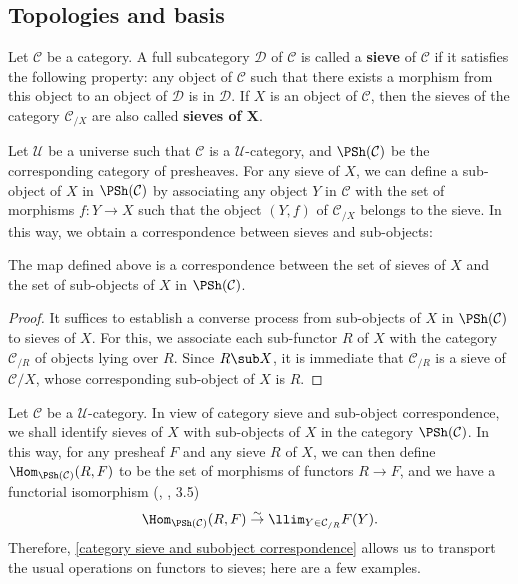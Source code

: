\subsection{Topologies and basis}
Let $\mathcal{C}$ be a category. A full subcategory $\mathcal{D}$ of $\mathcal{C}$ is called a \textbf{sieve} of $\mathcal{C}$ if it satisfies the following property: any object of $\mathcal{C}$ such that there exists a morphism from this object to an object of $\mathcal{D}$ is in $\mathcal{D}$. If $X$ is an object of $\mathcal{C}$, then the sieves of the category $\mathcal{C}_{/X}$ are also called \textbf{sieves of $\bm{X}$}.\par
Let $\mathscr{U}$ be a universe such that $\mathcal{C}$ is a $\mathscr{U}$-category, and $\PSh(\mathcal{C})$ be the corresponding category of presheaves. For any sieve of $X$, we can define a sub-object of $X$ in $\PSh(\mathcal{C})$ by associating any object $Y$ in $\mathcal{C}$ with the set of morphisms $f:Y\to X$ such that the object $(Y,f)$ of $\mathcal{C}_{/X}$ belongs to the sieve. In this way, we obtain a correspondence between sieves and sub-objects:
\begin{proposition}\label{category sieve and subobject correspondence}
The map defined above is a correspondence between the set of sieves of $X$ and the set of sub-objects of $X$ in $\PSh(\mathcal{C})$.
\end{proposition}
\begin{proof}
It suffices to establish a converse process from sub-objects of $X$ in $\PSh(\mathcal{C})$ to sieves of $X$. For this, we associate each sub-functor $R$ of $X$ with the category $\mathcal{C}_{/R}$ of objects lying over $R$. Since $R\sub X$, it is immediate that $\mathcal{C}_{/R}$ is a sieve of $\mathcal{C}{/X}$, whose corresponding sub-object of $X$ is $R$.
\end{proof}
Let $\mathcal{C}$ be a $\mathscr{U}$-category. In view of {category sieve and sub-object correspondence}, we shall identify sieves of $X$ with sub-objects of $X$ in the category $\PSh(\mathcal{C})$. In this way, for any presheaf $F$ and any sieve $R$ of $X$, we can then define $\Hom_{\PSh(\mathcal{C})}(R,F)$ to be the set of morphisms of functors $R\to F$, and we have a functorial isomorphism (\cite{SGA4-1}, , 3.5)
\begin{equation}\label{category Hom of functors char by limit}
\Hom_{\PSh(\mathcal{C})}(R,F) \stackrel{\sim}{\to } \llim_{Y\in\mathcal{C}_{/R}}F(Y).
\end{equation}
Therefore, \cref{category sieve and subobject correspondence} allows us to transport the usual operations on functors to sieves; here are a few examples.
